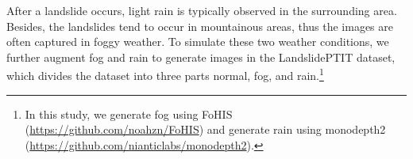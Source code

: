 \documentclass{ieeeaccess}
\begin{document}
After a landslide occurs, light rain is typically observed in the surrounding area. Besides, the landslides tend to occur in mountainous areas, thus the images are often captured in foggy weather. To simulate these two weather conditions, we further augment fog and rain to generate images in the LandslidePTIT dataset, which divides the dataset into three parts normal, fog, and rain.\footnote{In this study, we generate fog using FoHIS (\url{https://github.com/noahzn/FoHIS}) and generate rain using monodepth2 (\url{https://github.com/nianticlabs/monodepth2}).}

\end{document}

